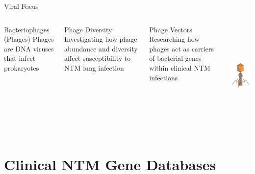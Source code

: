 \documentclass[11pt, xcolor=table]{beamer}
\begin{document}
	\begin{frame}{Viral Focus}
	\begin{columns}
	\begin{block}{Bacteriophages (Phages)}
	Phages are DNA viruses that infect prokaryotes
	\end{block}
	
	\begin{block}{Phage Diversity}
	Investigating how phage abundance and diversity affect susceptibility to NTM lung infection
	\end{block}
	
	\begin{block}{Phage Vectors}
	Researching how phages act as carriers of bacterial genes within clinical NTM infections
	\end{block}
	
	
	\includegraphics[height=5.5cm, width=5cm]{phage.png} \\
	\end{columns}
	
	
	\end{frame}

\section{Clinical NTM Gene Databases}
\end{document}
